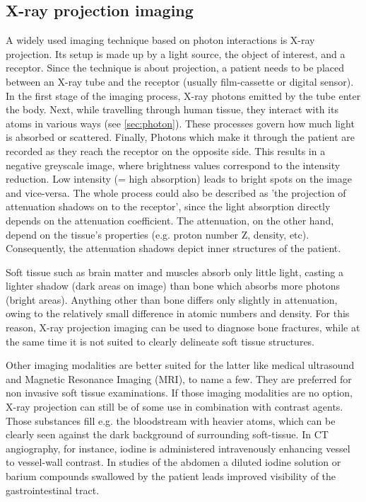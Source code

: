 \subsection{X-ray projection imaging}
A widely used imaging technique based on photon interactions is X-ray projection.
Its setup is made up by a light source, the object of interest, and a receptor.
Since the technique is about projection, a patient needs to be placed between an X-ray tube and the receptor (usually film-cassette or digital sensor).
In the first stage of the imaging process, X-ray photons emitted by the tube enter the body.
Next, while travelling through human tissue, they interact with its atoms in various ways (see \ref{sec:photon}).
These processes govern how much light is absorbed or scattered.
Finally, Photons which make it through the patient are recorded as they reach the receptor on the opposite side.
This results in a negative greyscale image, where brightness values correspond to the intensity reduction.
Low intensity (= high absorption) leads to bright spots on the image and vice-versa.
The whole process could also be described as 'the projection of attenuation shadows on to the receptor', since the light absorption directly depends on the attenuation coefficient. The attenuation, on the other hand, depend on the tissue's properties (e.g. proton number Z, density, etc).
Consequently, the attenuation shadows depict inner structures of the patient.

Soft tissue such as brain matter and muscles absorb only little light, casting a lighter shadow (dark areas on image) than bone which absorbs more photons (bright areas).
Anything other than bone differs only slightly in attenuation, owing to the relatively small difference in atomic numbers and density.
For this reason, X-ray projection imaging can be used to diagnose bone fractures, while at the same time it is not suited to clearly delineate soft tissue structures.
 
Other imaging modalities are better suited for the latter like medical ultrasound and Magnetic Resonance Imaging (MRI), to name a few. They are preferred for non invasive soft tissue examinations.
If those imaging modalities are no option, X-ray projection can still be of some use in combination with contrast agents.
Those substances fill e.g. the bloodstream with heavier atoms, which can be clearly seen against the dark background of surrounding soft-tissue.
In CT angiography, for instance, iodine is administered intravenously enhancing vessel to vessel-wall contrast.
In studies of the abdomen a diluted iodine solution or barium compounds swallowed by the patient leads improved visibility of the gastrointestinal tract.

